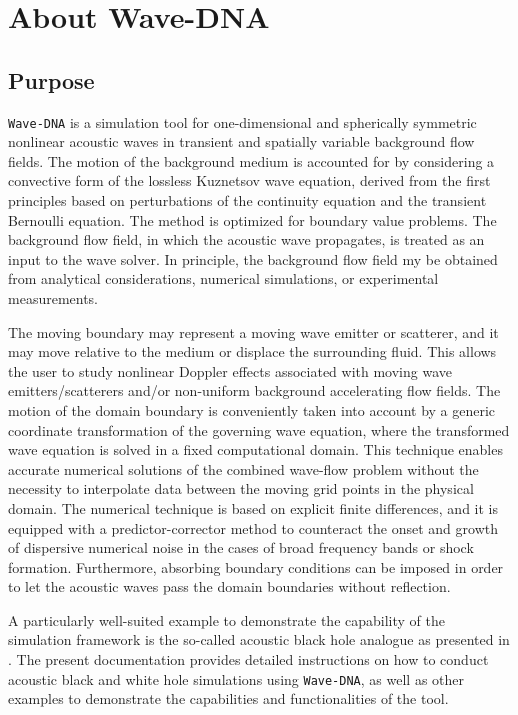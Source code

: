 \chapter{About Wave-DNA}
\label{chap:About Wave-DNA}

\section{Purpose}
\label{sec:Purpose}

{\tt Wave-DNA} is a simulation tool for one-dimensional and spherically symmetric nonlinear acoustic waves in transient and spatially variable background flow fields. The motion of the background medium is accounted for by considering a convective form of the lossless Kuznetsov wave equation, derived from the first principles based on perturbations of the continuity equation and the transient Bernoulli equation. The method is optimized for boundary value problems. The background flow field, in which the acoustic wave propagates, is treated as an input to the wave solver. In principle, the background flow field my be obtained from analytical considerations, numerical simulations, or experimental measurements.

The moving boundary may represent a moving wave emitter or scatterer, and it may move relative to the medium or displace the surrounding fluid. This allows the user to study nonlinear Doppler effects associated with moving wave emitters/scatterers and/or non-uniform background accelerating flow fields. The motion of the domain boundary is conveniently taken into account by a generic coordinate transformation of the governing wave equation, where the transformed wave equation is solved in a fixed computational domain. This technique enables accurate numerical solutions of the combined wave-flow problem without the necessity to interpolate data between the moving grid points in the physical domain. The numerical technique is based on explicit finite differences, and it is equipped with a predictor-corrector method to counteract the onset and growth of dispersive numerical noise in the cases of broad frequency bands or shock formation. Furthermore, absorbing boundary conditions can be imposed in order to let the acoustic waves pass the domain boundaries without reflection.

A particularly well-suited example to demonstrate the capability of the simulation framework is the so-called acoustic black hole analogue as presented in \citep{Schenke_et_al_2022_PoF}. The present documentation provides detailed instructions on how to conduct acoustic black and white hole simulations using {\tt Wave-DNA}, as well as other examples to demonstrate the capabilities and functionalities of the tool.

